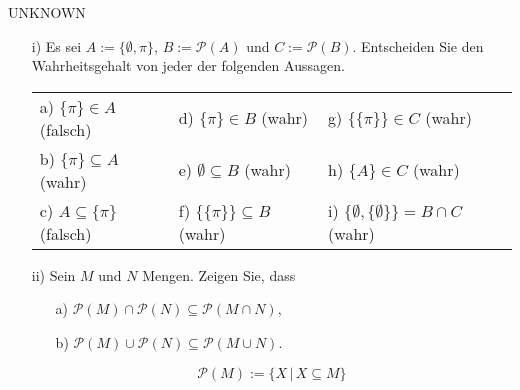 \documentclass{problemset}
\author{Michael van Straten}
\begin{document}
\maketitle

\begin{problem}{UNKNOWN}
\begin{enumerate}
    \item [i)] Es sei $A := \{\emptyset, \pi\}$, $B := \mathcal{P}(A)$ und $C := \mathcal{P}(B)$. Entscheiden Sie den Wahrheitsgehalt von jeder der folgenden Aussagen. \newline
          \renewcommand{\arraystretch}{1.5}
          \begin{tabularx}{\textwidth}{ X X X }
              a) $\{\pi\} \in A$ (falsch)       & d) $\{\pi\} \in B$ (wahr)           & g) $\{\{ \pi \}\} \in C$ (wahr)                     \\
              b) $\{\pi\} \subseteq A$ (wahr)   & e) $\emptyset \subseteq B$ (wahr)   & h) $\{A\} \in C$ (wahr)                             \\
              c) $A \subseteq \{\pi\}$ (falsch) & f) $\{\{\pi\}\} \subseteq B$ (wahr) & i) $\{\emptyset, \{\emptyset\}\} = B \cap C$ (wahr)
          \end{tabularx}

    \item [ii)] Sein $M$ und $N$ Mengen. Zeigen Sie, dass \begin{enumerate}
              \item [a)] $\mathcal{P}(M) \cap \mathcal{P}(N) \subseteq \mathcal{P}(M \cap N)$,
              \item [b)] $\mathcal{P}(M) \cup \mathcal{P}(N) \subseteq \mathcal{P}(M \cup N)$.
          \end{enumerate}
          \begin{displaymath}
              \mathcal{P}(M) := \{X\,|\,X \subseteq M\}
          \end{displaymath}


\end{enumerate}
\end{problem}
\end{document}
